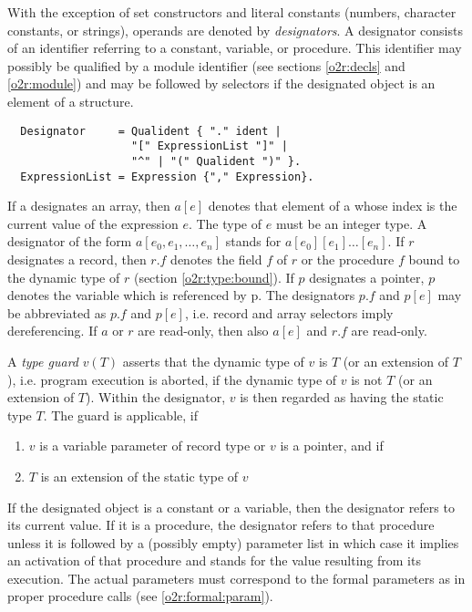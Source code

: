 With the exception of set constructors and literal constants
(numbers,
character constants, or strings), operands are denoted by {\em designators}.
A designator consists of an identifier referring to a constant, variable,
or procedure. This identifier may possibly be qualified by a module
identifier (see sections \ref{o2r:decls} and \ref{o2r:module})
and may be followed by selectors if the designated
object is an element of a structure.
{\BNFsize
\begin{verbatim}
  Designator     = Qualident { "." ident |
                   "[" ExpressionList "]" |
                   "^" | "(" Qualident ")" }.
  ExpressionList = Expression {"," Expression}.
\end{verbatim}}
If a designates an array, then $a[e]$ denotes that element of a whose
index is the current value of the expression $e$. The type of $e$ must
be an integer type. A designator of the form $a[e_0,e_1,\ldots,e_n]$ stands
for $a[e_0][e_1]\ldots[e_n]$.
If $r$ designates a record, then $r.f$ denotes the field $f$ of $r$ or the
procedure $f$ bound to the dynamic type of $r$
(section \ref{o2r:type:bound}).
If $p$ designates a pointer, $p$\arrow denotes
the variable which is referenced
by p. The designators $p$\arrow$.f$ and $p$\arrow$[e]$
may be abbreviated as $p.f$ and
$p[e]$, i.e. record and array selectors imply dereferencing.
If $a$ or $r$ are read-only, then also $a[e]$ and $r.f$ are read-only.

A {\em type guard } $v(T)$ asserts that the dynamic type of $v$ is $T$ (or
an extension of $T$), i.e. program execution is aborted, if the dynamic
type of $v$ is not $T$ (or an extension of $T$). Within the designator,
$v$ is then regarded as having the static type $T$. The guard is applicable,
if
\begin{enumerate}
\item
$v$ is a variable parameter of record type or $v$ is a pointer, and
if
\item
$T$ is an extension of the static type of $v$
\end{enumerate}

If the designated object is a constant or a variable, then the designator
refers to its current value. If it is a procedure, the designator
refers to that procedure unless it is followed by a (possibly empty)
parameter list in which case it implies an activation of that procedure
and stands for the value resulting from its execution. The actual
parameters must correspond to the formal parameters as in proper procedure
calls (see \ref{o2r:formal:param}).

